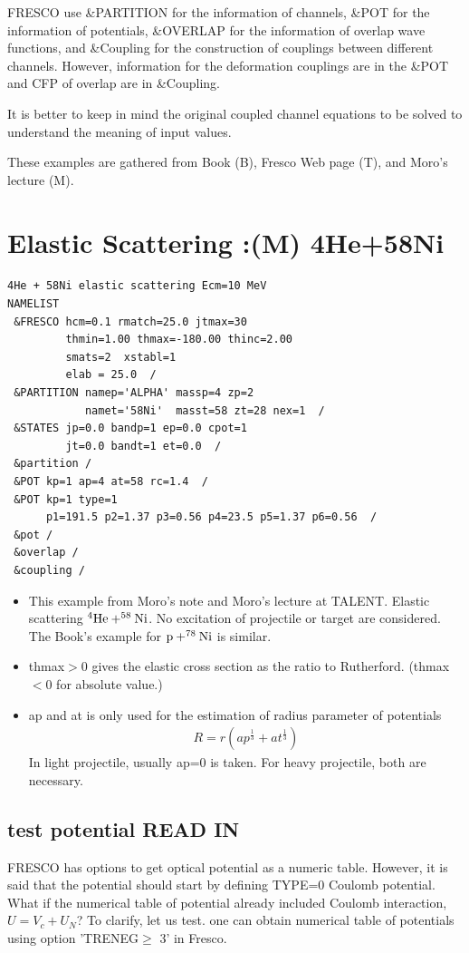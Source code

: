 \documentclass[11pt]{book}
\newcommand{\bea}{\begin{eqnarray}}
\newcommand{\eea}{\end{eqnarray}}
\begin{document}
FRESCO use \&PARTITION for the information of channels,
\&POT for the information of potentials,
\&OVERLAP for the information of overlap wave functions,
and \&Coupling for the construction of couplings between
different channels. However, information for the deformation 
couplings are in the \&POT and 
CFP of overlap are in \&Coupling.

It is better to keep in mind the original coupled channel equations 
to be solved to understand the meaning of input values. 

These examples are gathered from Book (B), Fresco Web page (T), and Moro's lecture (M).


\section{Elastic Scattering :(M) 4He+58Ni}
\begin{small} \begin{lstlisting}[frame=single]
4He + 58Ni elastic scattering Ecm=10 MeV
NAMELIST
 &FRESCO hcm=0.1 rmatch=25.0 jtmax=30
         thmin=1.00 thmax=-180.00 thinc=2.00
         smats=2  xstabl=1
         elab = 25.0  /
 &PARTITION namep='ALPHA' massp=4 zp=2 
            namet='58Ni'  masst=58 zt=28 nex=1  /
 &STATES jp=0.0 bandp=1 ep=0.0 cpot=1 
         jt=0.0 bandt=1 et=0.0  /
 &partition /
 &POT kp=1 ap=4 at=58 rc=1.4  /
 &POT kp=1 type=1 
      p1=191.5 p2=1.37 p3=0.56 p4=23.5 p5=1.37 p6=0.56  /
 &pot /
 &overlap /
 &coupling /
\end{lstlisting} \end{small}

\begin{itemize} 
\item This example from Moro's note and Moro's lecture at TALENT. 
 Elastic scattering ${}^4{\rm He}+^{58}{\rm Ni}$. 
 No excitation of projectile or target are considered.
 The Book's example for ${\rm p}+^{78}{\rm Ni}$ is similar. 

\item thmax$>0$ gives the elastic cross section as the ratio to Rutherford. 
(thmax$<0$ for absolute value.)
\item ap and at is only used for the estimation of radius parameter of potentials
\bea 
R=r(ap^{\frac{1}{3}}+at^{\frac{1}{3}})
\eea 
In light projectile, usually ap=0 is taken. For heavy projectile, both are necessary.

\end{itemize} 

\subsection{test potential READ IN}
FRESCO has options to get optical potential as a numeric table.
However, it is said that the potential should start by defining TYPE=0 Coulomb potential.
What if the numerical table of potential already included Coulomb interaction, $U=V_c+U_N$? 
To clarify, let us test. one can obtain numerical table of potentials using option 'TRENEG$\geq$ 3'
in Fresco. 
\end{document}
